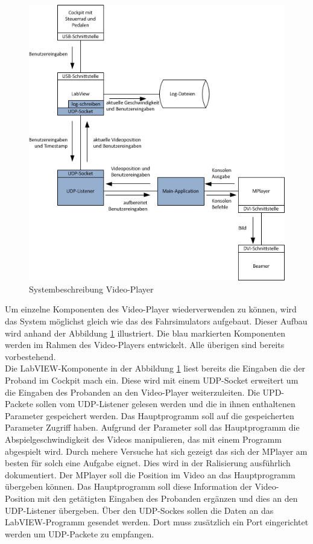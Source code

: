 \begin{figure}[h]
\centering 
\includegraphics{src/Systembeschreibung_VideoPlayer.png}
\caption{Systembeschreibung Video-Player} %
\label{Systembeschreibung Video-Player} %
\end{figure}
Um einzelne Komponenten des Video-Player wiederverwenden zu können, wird das System möglichst gleich wie das des Fahrsimulators aufgebaut. Dieser Aufbau wird anhand der Abbildung \ref{Systembeschreibung Video-Player} illustriert.  Die blau markierten Komponenten werden im Rahmen des Video-Players entwickelt. Alle überigen sind bereits vorbestehend. \\
Die LabVIEW-Komponente in der Abbildung \ref{Systembeschreibung Video-Player} liest bereits die Eingaben die der Proband im Cockpit mach ein. Diese wird mit einem UDP-Socket erweitert um die Eingaben des Probanden an den Video-Player weiterzuleiten. Die UPD-Packete sollen vom UDP-Listener gelesen werden und die in ihnen enthaltenen Parameter gespeichert werden. Das Hauptprogramm soll auf die gespeicherten Parameter Zugriff haben. Aufgrund der Parameter soll das Hauptprogramm die Abspielgeschwindigkeit des Videos manipulieren, das mit einem Programm abgespielt wird. Durch mehere Versuche hat sich gezeigt das sich der MPlayer am besten für solch eine Aufgabe eignet. Dies wird in der Ralisierung ausführlich dokumentiert. Der MPlayer soll die Position im Video an das Hauptprogramm übergeben können. Das Hauptprogramm soll diese Information der Video-Position mit den getätigten Eingaben des Probanden ergänzen und dies an den UDP-Listener übergeben. Über den UDP-Sockes sollen die Daten an das LabVIEW-Programm gesendet werden. Dort muss zusätzlich ein Port eingerichtet werden um UDP-Packete zu empfangen. 

